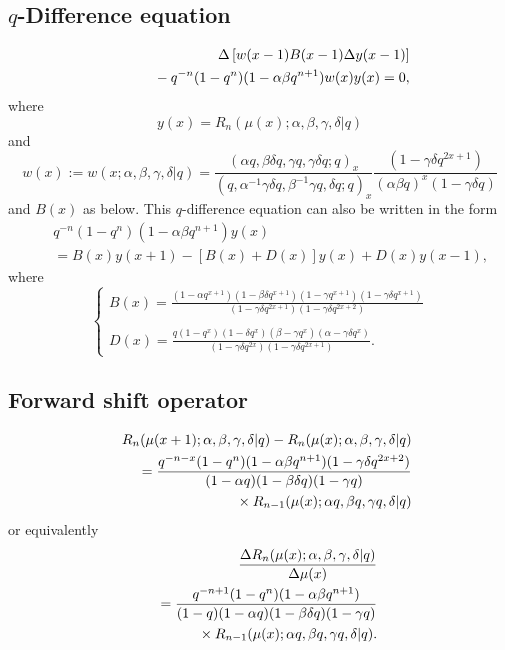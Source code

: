 \documentclass[envcountchap,graybox]{svmono}
\newcommand{\mathindent}{\hspace{7.5mm}}
\begin{document}
\subsection*{$q$-Difference equation}
\begin{eqnarray}
\label{dvqRacah1}
& &\Delta\left[w(x-1)B(x-1)\Delta y(x-1)\right]\nonumber\\
& &{}\mathindent{}-q^{-n}(1-q^n)(1-\alpha\beta q^{n+1})w(x)y(x)=0,
\end{eqnarray}
where
$$y(x)=R_n(\mu(x);\alpha,\beta,\gamma,\delta|q)$$
and
$$w(x):=w(x;\alpha,\beta,\gamma,\delta|q)=
\frac{(\alpha q,\beta\delta q,\gamma q,\gamma\delta q;q)_x}{(q,\alpha^{-1}\gamma\delta q,\beta^{-1}\gamma q,\delta q;q)_x}
\frac{(1-\gamma\delta q^{2x+1})}{(\alpha\beta q)^x(1-\gamma\delta q)}$$
and $B(x)$ as below. This $q$-difference equation can also be written in the
form
\begin{eqnarray}
\label{dvqRacah2}
& &q^{-n}(1-q^n)(1-\alpha\beta q^{n+1})y(x)\nonumber\\
& &{}=B(x)y(x+1)-\left[B(x)+D(x)\right]y(x)+D(x)y(x-1),
\end{eqnarray}
where
$$\left\{\begin{array}{l}\displaystyle B(x)=\frac{(1-\alpha q^{x+1})(1-\beta\delta q^{x+1})(1-\gamma q^{x+1})(1-\gamma\delta q^{x+1})}
{(1-\gamma\delta q^{2x+1})(1-\gamma\delta q^{2x+2})}\\
\\
\displaystyle D(x)=\frac{q(1-q^x)(1-\delta q^x)(\beta-\gamma q^x)(\alpha-\gamma\delta q^x)}
{(1-\gamma\delta q^{2x})(1-\gamma\delta q^{2x+1})}.\end{array}\right.$$

\subsection*{Forward shift operator}
\begin{eqnarray}
\label{shift1qRacahI}
& &R_n(\mu(x+1);\alpha,\beta,\gamma,\delta|q)-R_n(\mu(x);\alpha,\beta,\gamma,\delta|q)\nonumber\\
& &{}=\frac{q^{-n-x}(1-q^n)(1-\alpha\beta q^{n+1})(1-\gamma\delta q^{2x+2})}
{(1-\alpha q)(1-\beta\delta q)(1-\gamma q)}\nonumber\\
& &{}\mathindent\times R_{n-1}(\mu(x);\alpha q,\beta q,\gamma q,\delta|q)
\end{eqnarray}
or equivalently
\begin{eqnarray}
\label{shift1qRacahII}
& &\frac{\Delta R_n(\mu(x);\alpha,\beta,\gamma,\delta|q)}{\Delta\mu(x)}\nonumber\\
& &{}=\frac{q^{-n+1}(1-q^n)(1-\alpha\beta q^{n+1})}{(1-q)(1-\alpha q)(1-\beta\delta q)(1-\gamma q)}\nonumber\\
& &{}\mathindent\times R_{n-1}(\mu(x);\alpha q,\beta q,\gamma q,\delta|q).
\end{eqnarray}
\end{document}
